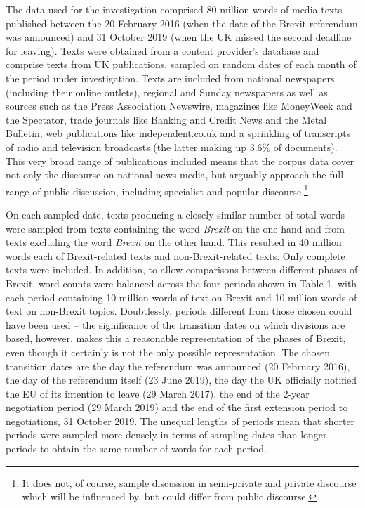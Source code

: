 \documentclass[12pt]{article}
\newenvironment{styleStandard}{\setlength\leftskip{0cm}\setlength\rightskip{0cm plus 1fil}\setlength\parindent{0cm}\setlength\parfillskip{0pt plus 1fil}\setlength\parskip{0in plus 1pt}\writerlistparindent\writerlistleftskip\leavevmode\normalfont\normalsize\writerlistlabel\ignorespaces}{\unskip\vspace{0.111in plus 0.0111in}\par}
\newcommand\writerlistleftskip{}
\newcommand\writerlistparindent{}
\newcommand\writerlistlabel{}
\begin{document}
\begin{styleStandard}
The data used for the investigation comprised 80 million words of media texts published between the 20 February 2016 (when the date of the Brexit referendum was announced) and 31 October 2019 (when the UK missed the second deadline for leaving). Texts were obtained from a content provider’s database and comprise texts from UK publications, sampled on random dates of each month of the period under investigation. Texts are included from national newspapers (including their online outlets), regional and Sunday newspapers as well as sources such as the Press Association Newswire, magazines like MoneyWeek and the Spectator, trade journals like Banking and Credit News and the Metal Bulletin, web publications like independent.co.uk and a sprinkling of transcripts of radio and television broadcasts (the latter making up 3.6\% of documents). This very broad range of publications included means that the corpus data cover not only the discourse on national news media, but arguably approach the full range of public discussion, including specialist and popular discourse.\footnote{It does not, of course, sample discussion in semi-private and private discourse which will be influenced by, but could differ from public discourse.}
\end{styleStandard}

\begin{styleStandard}
On each sampled date, texts producing a closely similar number of total words were sampled from texts containing the word \textit{Brexit }on the one hand and from texts excluding the word \textit{Brexit }on the other hand. This resulted in 40 million words each of Brexit-related texts and non-Brexit-related texts. Only complete texts were included. In addition, to allow comparisons between different phases of Brexit, word counts were balanced across the four periods shown in Table 1, with each period containing 10 million words of text on Brexit and 10 million words of text on non-Brexit topics. Doubtlessly, periods different from those chosen could have been used – the significance of the transition dates on which divisions are based, however, makes this a reasonable representation of the phases of Brexit, even though it certainly is not the only possible representation. The chosen transition dates are the day the referendum was announced (20 February 2016), the day of the referendum itself (23 June 2019), the day the UK officially notified the EU of its intention to leave (29 March 2017), the end of the 2-year negotiation period (29 March 2019) and the end of the first extension period to negotiations, 31 October 2019. The unequal lengths of periods mean that shorter periods were sampled more densely in terms of sampling dates than longer periods to obtain the same number of words for each period. 
\end{styleStandard}
\end{document}
